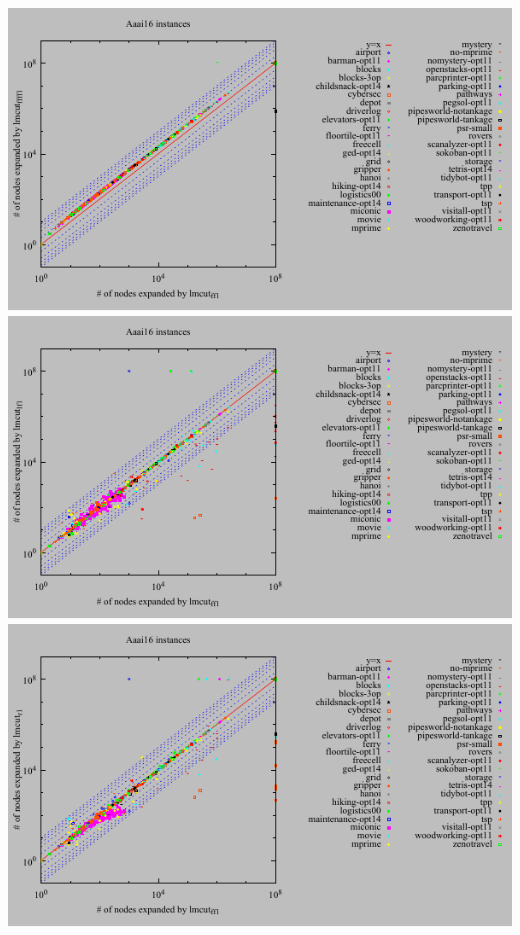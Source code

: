\includegraphics{tables/aaai16-expanded-lmcut_ff-lmcut_ffff.pdf}
\linebreak
\includegraphics{tables/aaai16-expanded-lmcut_ff-lmcut_lf.pdf}
\linebreak
\includegraphics{tables/aaai16-expanded-lmcut_ff-lmcut_r.pdf}
\linebreak
